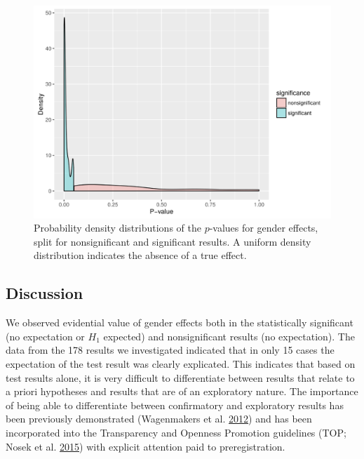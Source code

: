 \documentclass[a5paper]{book}
\begin{document}
\begin{figure}[h]

{\centering \includegraphics[width=1\linewidth]{assets/figures/tgtbf-fig6.pdf.svg} 

}

\caption{Probability density distributions of the $p$-values for gender effects, split for nonsignificant and significant results. A uniform density distribution indicates the absence of a true effect.}\label{fig:tgtbf-fig6}
\end{figure}

\subsection{Discussion}\label{discussion-2}

We observed evidential value of gender effects both in the statistically
significant (no expectation or \(H_1\) expected) and nonsignificant
results (no expectation). The data from the 178 results we investigated
indicated that in only 15 cases the expectation of the test result was
clearly explicated. This indicates that based on test results alone, it
is very difficult to differentiate between results that relate to a
priori hypotheses and results that are of an exploratory nature. The
importance of being able to differentiate between confirmatory and
exploratory results has been previously demonstrated (Wagenmakers et al.
\protect\hyperlink{ref-doi:10.1177ux2f1745691612463078}{2012}) and has
been incorporated into the Transparency and Openness Promotion
guidelines (TOP; Nosek et al.
\protect\hyperlink{ref-doi:10.1126ux2fscience.aab2374}{2015}) with
explicit attention paid to preregistration.
\end{document}

